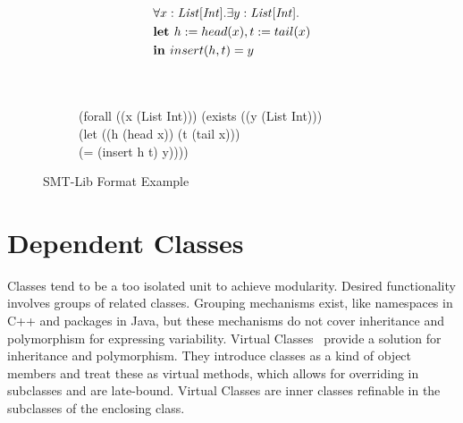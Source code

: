 \begin{figure}[t]
\begin{subfigure}{1\textwidth}
\begin{align*}
&\forall x: \mathit{List[Int]}. \exists y: \mathit{List[Int]}. \\
&\textbf{let } h := head(x), t := tail(x)\\
&\textbf{in } insert(h, t) = y
\end{align*}
\label{fig:smtlib-example-fo}
\end{subfigure}
\begin{subfigure}{1\textwidth}
\centering
\qquad\\\qquad\\
(forall ((x (List Int))) (exists ((y (List Int))) \\
(let ((h (head x)) (t (tail x))) \\
(= (insert h t) y))))
\label{fig:smtlib-example-smtlib}
\end{subfigure}
\caption{SMT-Lib Format Example}
\label{fig:smtlib-example}
\end{figure}

\section{Dependent Classes}
\label{sec:depcls}
Classes tend to be a too isolated unit to achieve modularity.
Desired functionality involves groups of related classes.
Grouping mechanisms exist, like namespaces in C++ and packages in Java,
but these mechanisms do not cover inheritance and polymorphism for expressing variability.
Virtual Classes~\cite{virtual:classes, vaidas:thesis} provide a solution for inheritance and polymorphism.
They introduce classes as a kind of object members and treat these as virtual methods,
which allows for overriding in subclasses and are late-bound.
Virtual Classes are inner classes refinable in the subclasses of the enclosing class. %

